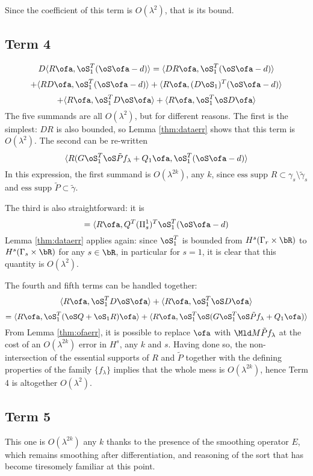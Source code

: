 Since the coefficient of this term is $O(\lambda^2)$, that is its bound.

\subsection{Term 4}
\[
D \langle R\ofa,   \oS_1^T(\oS\ofa -d) \rangle = \langle DR \ofa, \oS_1^T(\oS\ofa -d) \rangle
\]
\[
+ \langle R D\ofa, \oS_1^T(\oS\ofa -d) \rangle + \langle R\ofa, (D\oS_1)^T(\oS\ofa -d) \rangle
\]
\[
+\langle R\ofa,\oS_1^T D\oS\ofa \rangle + \langle R\ofa, \oS_1^T \oS D\ofa \rangle
\]
The five summands are all $O(\lambda^2)$, but for different reasons. The first is the simplest: $DR$ is also bounded, so Lemma \ref{thm:dataerr} shows that this term is $O(\lambda^2)$. The second can be re-written
\[
\langle R(G \oS_1^T \oS\tilde{P}f_{\lambda} + Q_1\ofa, \oS_1^T(\oS\ofa -d) \rangle
\]
In this expression, the first summand is $O(\lambda^{2k})$, any $k$, since $\mbox{ess supp }R \subset \gamma_s \setminus \tilde{\gamma}_s$ and $\mbox{ess supp }\tilde{P} \subset \tilde{\gamma}$. 

The third is also straightforward: it is
\[
= \langle R\ofa,Q^T(\Pi^1_s)^T\oS_1^T (\oS\ofa -d)
\]
Lemma \ref{thm:dataerr} applies again: since $\oS_1^T$ is bounded from $H^s(\Gamma_r \times \bR)$ to $H^s(\Gamma_s \times \bR)$ for any $s \in \bR$, in particular for $s=1$, it is clear that this quantity is $O(\lambda^2)$.

The fourth and fifth terms can be handled together:
\[
\langle R\ofa,\oS_1^T D\oS\ofa \rangle + \langle R\ofa, \oS_1^T \oS D\ofa \rangle
\]
\[
=\langle R\ofa,\oS_1^T (\oS Q + \oS_1 R)\ofa \rangle + \langle R\ofa, \oS_1^T \oS (G \oS_1^T\oS \tilde{P}f_{\lambda} + Q_1\ofa) \rangle
\]
From Lemma \ref{thm:ofaerr}, it is possible to replace $\ofa$ with $\Mld M \tilde{P}f_{\lambda}$ at the cost of an $O(\lambda^{2k})$ error in $H^s$, any $k$ and $s$. Having done so, the non-intersection of the essential supports of $R$ and $\tilde{P}$ together with the defining properties of the family $\{f_{\lambda}\}$ implies that the whole mess is $O(\lambda^{2k})$, hence Term 4 is altogether $O(\lambda^2)$.

\subsection{Term 5}
This one is $O(\lambda^{2k})$ any $k$ thanks to the presence of the smoothing operator $E$, which remains smoothing after differentiation, and reasoning of the sort that has become tiresomely familiar at this point.

